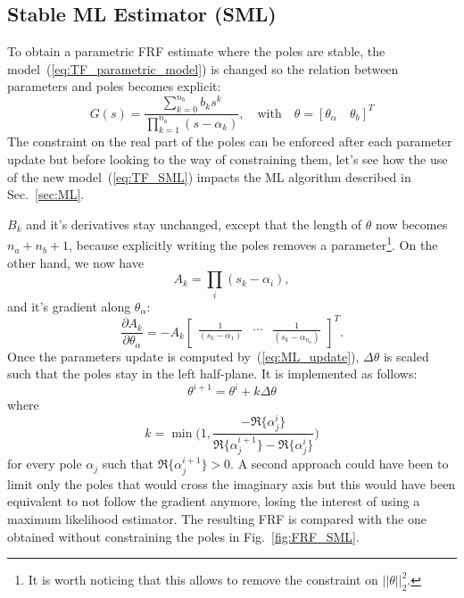 \subsection{Stable ML Estimator (SML)}
\label{sec:SML}

To obtain a parametric FRF estimate where the poles are stable, the model~(\ref{eq:TF_parametric_model}) is changed so the relation between parameters and poles becomes explicit:
\begin{equation}
    G(s) = \frac{\sum_{k=0}^{n_b} b_k s^k}{\prod_{k=1}^{n_a} (s-\alpha_k)}, \quad \text{with} \quad \theta = [\theta_\alpha \quad \theta_b]^T
    \label{eq:TF_SML}
\end{equation}
The constraint on the real part of the poles can be enforced after each parameter update but before looking to the way of constraining them, let's see how the use of the new model~(\ref{eq:TF_SML}) impacts the ML algorithm described in Sec.~\ref{sec:ML}.

$B_k$ and it's derivatives stay unchanged, except that the length of $\theta$ now becomes $n_a+n_b+1$, because explicitly writing the poles removes a parameter\footnote{It is worth noticing that this allows to remove the constraint on $||\theta||_2^2$.}. On the other hand, we now have
\begin{equation}
    A_k = \prod_{i} (s_k-\alpha_i),
\end{equation}
and it's gradient along $\theta_\alpha$:
\begin{equation}
    \frac{\partial A_k}{\partial \theta_\alpha} = - A_k \begin{bmatrix}
        \frac{1}{(s_k - \alpha_1)} & \cdots & \frac{1}{(s_k - \alpha_{n_a})}
    \end{bmatrix}^T.
\end{equation}
Once the parameters update is computed by~(\ref{eq:ML_update}), $\Delta \theta$ is scaled such that the poles stay in the left half-plane. It is implemented as follows:
\begin{equation}
    \theta^{i+1} = \theta^i + k \Delta \theta
\end{equation}
where 
\begin{equation}
    k = \min\Bigg(1, \frac{-\Re\Big\{\alpha_j^ i\Big\}}{\Re\Big\{\alpha_j^{i+1}\Big\} - \Re\Big\{\alpha_j^i\Big\}}\Bigg)
    \label{eq:delta_theta_limit}
\end{equation}
for every pole $\alpha_j$ such that $\Re\Big\{\alpha_j^{i+1}\Big\} > 0$. A second approach could have been to limit only the poles that would cross the imaginary axis but this would have been equivalent to not follow the gradient anymore, losing the interest of using a maximum likelihood estimator. The resulting FRF is compared with the one obtained without constraining the poles in Fig.~\ref{fig:FRF_SML}.

